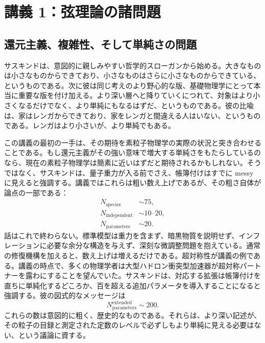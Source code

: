 \chapter{講義 1：弦理論の諸問題}


\section{還元主義、複雑性、そして単純さの問題}

サスキンドは、意図的に親しみやすい哲学的スローガンから始める。大きなものは小さなものからできており、小さなものはさらに小さなものからできている、というものである。次に彼は同じ考えのより野心的な版、基礎物理学にとって本当に重要な版を付け加える。より深い層へと降りていくにつれて、対象はより小さくなるだけでなく、より単純にもなるはずだ、というものである。彼の比喩は、家はレンガからできており、家をレンガと間違える人はいない、というものである。レンガはより小さいが、より単純でもある。

この講義の最初の一手は、その期待を素粒子物理学の実際の状況と突き合わせることである。もし還元主義がその強い意味で増大する単純さをもたらしているのなら、現在の素粒子物理学は簡素に近いはずだと期待されるかもしれない。そうではなく、サスキンドは、量子重力が入る前でさえ、帳簿付けはすでに messy に見えると強調する。講義ではこれらは粗い数え上げであるが、その粗さ自体が論点の一部である：
\begin{equation}
\begin{aligned}
N_{\mathrm{species}}&\sim 75,\\
N_{\mathrm{independent}}&\sim 10\text{--}20,\\
N_{\mathrm{parameters}}&\sim 20.
\end{aligned}
\end{equation}
話はこれで終わらない。標準模型は重力を含まず、暗黒物質を説明せず、インフレーションに必要な余分な構造を与えず、深刻な微調整問題を抱えている。通常の修復機構を加えると、数え上げは増えるだけである。超対称性が講義の例である。講義の時点で、多くの物理学者は大型ハドロン衝突型加速器が超対称パートナーを露わにすることを望んでいた。サスキンドは、対応する拡張は帳簿付けを直ちに単純化するどころか、百を超える追加パラメータを導入することになると強調する。彼の図式的なメッセージは
\begin{equation}
N_{\mathrm{parameters}}^{\mathrm{extended}} \sim 200.
\end{equation}
これらの数は意図的に粗く、歴史的なものである。それらは、より深い記述が、その粒子の目録と測定された定数のレベルで必ずしもより単純に見える必要はない、という議論に資する。

